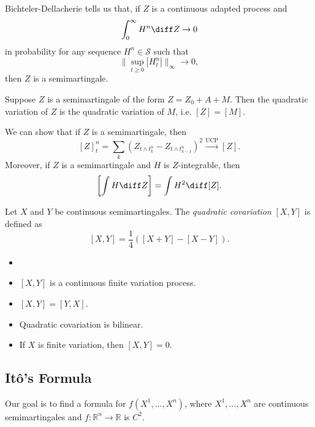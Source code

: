\documentclass[12pt]{article}
\begin{document}
\begin{remark}
	Bichteler-Dellacherie tells us that, if $Z$ is a continuous adapted process and
	\[
	\int_0^{\infty} H^{n} \diff Z \to 0
	\]
	in probability for any sequence $H^{n} \in \mathcal{S}$ such that
	\[
	\bigl\|\sup_{t \geq 0} |H_t^{n}|\bigr\|_\infty \to 0,
	\]
	then $Z$ is a semimartingale.
\end{remark}

\begin{definition}
	Suppose $Z$ is a semimartingale of the form $Z = Z_0 + A + M$. Then the quadratic variation of $Z$ is the quadratic variation of $M$, i.e. $[Z] = [M]$.
\end{definition}

We can show that if $Z$ is a semimartingale, then
\[
	[Z]_t^{n} = \sum_{k} (Z_{t \wedge t_k^{n}} - Z_{t \wedge t_{k-1}^{n}})^2 \overset{\text{UCP}}\to [Z].
\]
Moreover, if $Z$ is a semimartingale and $H$ is $Z$-integrable, then
\[
	\left[ \int H \diff Z \right] = \int H^2 \diff [Z].
\]

\begin{definition}
	Let $X$ and $Y$ be continuous semimartingales. The \emph{quadratic covariation} $[X, Y]$ is defined as
	\[
		[X, Y] = \frac14 \left( [X+Y] - [X-Y]\right).
	\]
\end{definition}

\begin{proposition}
	\begin{itemize}
		\item[]
		\item $[X, Y]$ is a continuous finite variation process.
		\item $[X, Y] = [Y, X]$.
		\item Quadratic covariation is bilinear.
		\item If $X$ is finite variation, then $[X, Y] = 0$.
	\end{itemize}
	
\end{proposition}


\subsection{It\^o's Formula}%
\label{sub:if}

Our goal is to find a formula for $f(X^1, \ldots, X^{n})$, where $X^1, \ldots, X^{n}$ are continuous semimartingales and $f : \mathbb{R}^{n} \to \mathbb{R}$ is $C^2$.
\end{document}
